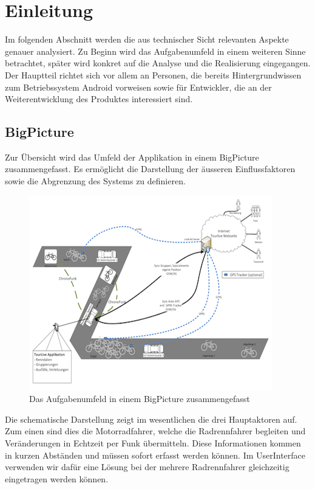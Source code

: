 \chapter{Einleitung}

Im folgenden Abschnitt werden die aus technischer Sicht relevanten Aspekte genauer analysiert. Zu Beginn wird das Aufgabenumfeld in einem weiteren Sinne betrachtet, später wird konkret auf die Analyse und die Realisierung eingegangen.
\\

Der Hauptteil richtet sich vor allem an Personen, die bereits Hintergrundwissen zum Betriebssystem Android vorweisen sowie für Entwickler, die an der Weiterentwicklung des Produktes interessiert sind.

\section{BigPicture}
Zur Übersicht wird das Umfeld der Applikation in einem BigPicture zusammengefasst. Es ermöglicht die Darstellung der äusseren Einflussfaktoren sowie die Abgrenzung des Systems zu definieren.

\begin{figure}[h!]
\caption{Das Aufgabenumfeld in einem BigPicture zusammengefasst}
\centering
\includegraphics{05bericht/images/big_picture.png}
\end{figure} 

Die schematische Darstellung zeigt im wesentlichen die drei Hauptaktoren auf. Zum einen sind dies die Motorradfahrer, welche die Radrennfahrer begleiten und Veränderungen in Echtzeit per Funk übermitteln. Diese Informationen kommen in kurzen Abständen und müssen sofort erfasst werden können. Im UserInterface verwenden wir dafür eine Lösung bei der mehrere Radrennfahrer gleichzeitig eingetragen werden können.
\\

